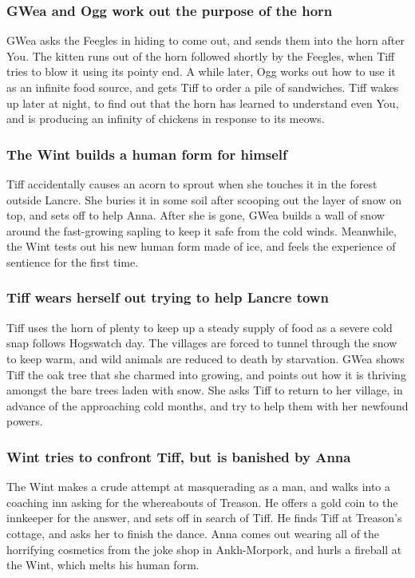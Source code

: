 \subsubsection{\Gls{GWea} and \Gls{Ogg} work out the purpose of the horn}
\Gls{GWea} asks the Feegles in hiding to come out, and sends them into the horn after \Gls{You}.
The kitten runs out of the horn followed shortly by the Feegles, when \Gls{Tiff} tries to blow it
using its pointy end. A while later, \Gls{Ogg} works out how to use it as an infinite food source,
and gets \Gls{Tiff} to order a pile of sandwiches. \Gls{Tiff} wakes up later at night, to find out
that the horn has learned to understand even \Gls{You}, and is producing an infinity of chickens in
response to its meows.

\subsubsection{The \Gls{Wint} builds a human form for himself}
\Gls{Tiff} accidentally causes an acorn to sprout when she touches it in the forest outside Lancre.
She buries it in some soil after scooping out the layer of snow on top, and sets off to help
\Gls{Anna}. After she is gone, \Gls{GWea} builds a wall of snow around the fast-growing sapling to
keep it safe from the cold winds. Meanwhile, the \Gls{Wint} tests out his new human form made of
ice, and feels the experience of sentience for the first time.

\subsubsection{\Gls{Tiff} wears herself out trying to help Lancre town}
\Gls{Tiff} uses the horn of plenty to keep up a steady supply of food as a severe cold snap follows
Hogswatch day. The villages are forced to tunnel through the snow to keep warm, and wild animals are
reduced to death by starvation. \Gls{GWea} shows \Gls{Tiff} the oak tree that she charmed into
growing, and points out how it is thriving amongst the bare trees laden with snow. She asks
\Gls{Tiff} to return to her village, in advance of the approaching cold months, and try to help them
with her newfound powers.

\subsubsection{\Gls{Wint} tries to confront \Gls{Tiff}, but is banished by \Gls{Anna}}
The \Gls{Wint} makes a crude attempt at masquerading as a man, and walks into a coaching inn asking
for the whereabouts of \Gls{Treason}. He offers a gold coin to the innkeeper for the answer, and
sets off in search of \Gls{Tiff}. He finds \Gls{Tiff} at \Gls{Treason}'s cottage, and asks her to
finish the dance. \Gls{Anna} comes out wearing all of the horrifying cosmetics from the joke shop
in Ankh-Morpork, and hurls a fireball at the \Gls{Wint}, which melts his human form.

